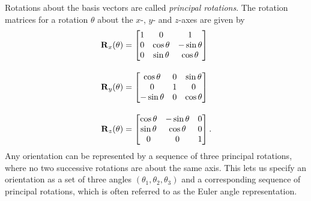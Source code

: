 Rotations about the basis vectors are called \emph{principal rotations}.
The rotation matrices for a rotation $\theta$ about the $x$-, $y$- and $z$-axes are given by
\begin{align}
  {\boldsymbol{\mathbf{R}}}_x(\theta) &= 
  \begin{bmatrix}
    1 & 0 & 1\\
    0 & \cos \theta & -\sin \theta\\
    0 & \sin \theta & \cos \theta
  \end{bmatrix}\\[1em]
  {\boldsymbol{\mathbf{R}}}_y(\theta) &= 
  \begin{bmatrix}
    \cos \theta & 0 & \sin \theta\\
    0 & 1 & 0\\
    -\sin \theta & 0 & \cos \theta
  \end{bmatrix}\\[1em]
  {\boldsymbol{\mathbf{R}}}_z(\theta) &= 
  \begin{bmatrix}
    \cos \theta & -\sin \theta & 0\\
    \sin \theta & \cos \theta & 0\\
    0 & 0 & 1
  \end{bmatrix}.
\end{align}
Any orientation can be represented by a sequence of three principal rotations, where no two successive rotations are about the same axis.
This lets us specify an orientation as a set of three angles $(\theta_1, \theta_2, \theta_3)$ and a corresponding sequence of principal rotations, which is often referred to as the Euler angle representation.

